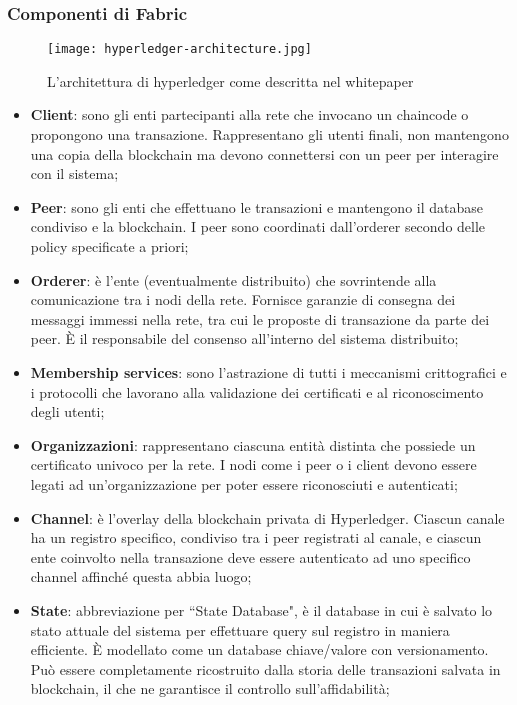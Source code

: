 		\subsubsection{Componenti di Fabric}
			\begin{figure}[ht]
				\centering
				\texttt{[image: hyperledger-architecture.jpg]}
				\caption{L'architettura di hyperledger come descritta nel whitepaper}
				\label{fig:hyperledger_architecture}
			\end{figure}
			\begin{itemize}
				\item \textbf{Client}: sono gli enti partecipanti alla rete che invocano un chaincode o propongono una transazione. Rappresentano gli utenti finali, non mantengono una copia della blockchain ma devono connettersi con un peer per interagire con il sistema;
				\item \textbf{Peer}: sono gli enti che effettuano le transazioni e mantengono il database condiviso e la blockchain. I peer sono coordinati dall'orderer secondo delle policy specificate a priori;
				\item \textbf{Orderer}: è l'ente (eventualmente distribuito) che sovrintende alla comunicazione tra i nodi della rete. Fornisce garanzie di consegna dei messaggi immessi nella rete, tra cui le proposte di transazione da parte dei peer. È il responsabile del consenso all'interno del sistema distribuito;
				\item \textbf{Membership services}: sono l'astrazione di tutti i meccanismi crittografici e i protocolli che lavorano alla validazione dei certificati e al riconoscimento degli utenti; 
				\item \textbf{Organizzazioni}: rappresentano ciascuna entità distinta che possiede un certificato univoco per la rete. I nodi come i peer o i client devono essere legati ad un'organizzazione per poter essere riconosciuti e autenticati;
				\item \textbf{Channel}: è l'overlay della blockchain privata di Hyperledger. Ciascun canale ha un registro specifico, condiviso tra i peer registrati al canale, e ciascun ente coinvolto nella transazione deve essere autenticato ad uno specifico channel affinché questa abbia luogo;
				\item \textbf{State}: abbreviazione per ``State Database", è il database in cui è salvato lo stato attuale del sistema per effettuare query sul registro in maniera efficiente. È modellato come un database chiave/valore con versionamento. Può essere completamente ricostruito dalla storia delle transazioni salvata in blockchain, il che ne garantisce il controllo sull'affidabilità;

\end{itemize}
